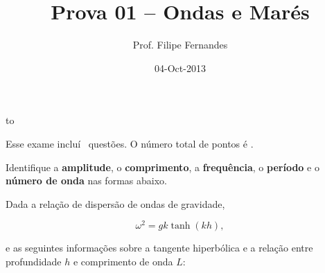 \documentclass[letterpaper,portuguese,12pt,pdftex]{exam}
\title{Prova 01 -- Ondas e Marés}
\author{Prof. Filipe Fernandes}
\date{04-Oct-2013}
\begin{document}
\maketitle
\doublespacing

\vspace{1cm}
\hbox to \textwidth{Nome e número de matrícula:\enspace\hrulefill}
\vspace{1cm}

\begin{minipage}{.8\textwidth}
Esse exame incluí \numquestions\ questões. O número total de pontos é \numpoints. %
\end{minipage}


\begin{questions}

\question
Identifique a {\bf amplitude}, o {\bf comprimento}, a {\bf frequência},
o {\bf período} e o {\bf número de onda} nas formas abaixo.



\question
Dada a relação de dispersão de ondas de gravidade,

\[
  \omega^2 = gk\tanh(kh),
\]


e as seguintes informações sobre a tangente hiperbólica e a relação entre
profundidade $h$ e comprimento de onda $L$:


\end{questions}
\end{document}
